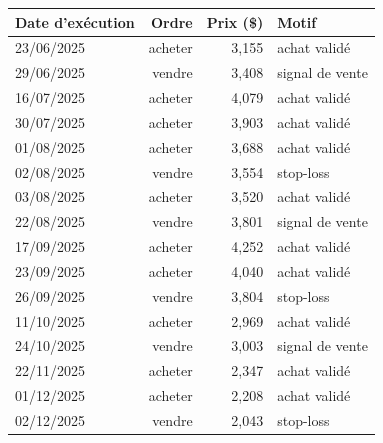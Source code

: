 \begin{tabular}{lrrl}\toprule
Date d'exécution & Ordre & Prix (\$) & Motif \\\midrule
23/06/2025 & acheter & 3,155 & achat validé \\
29/06/2025 & vendre & 3,408 & signal de vente \\
16/07/2025 & acheter & 4,079 & achat validé \\
30/07/2025 & acheter & 3,903 & achat validé \\
01/08/2025 & acheter & 3,688 & achat validé \\
02/08/2025 & vendre & 3,554 & stop-loss \\
03/08/2025 & acheter & 3,520 & achat validé \\
22/08/2025 & vendre & 3,801 & signal de vente \\
17/09/2025 & acheter & 4,252 & achat validé \\
23/09/2025 & acheter & 4,040 & achat validé \\
26/09/2025 & vendre & 3,804 & stop-loss \\
11/10/2025 & acheter & 2,969 & achat validé \\
24/10/2025 & vendre & 3,003 & signal de vente \\
22/11/2025 & acheter & 2,347 & achat validé \\
01/12/2025 & acheter & 2,208 & achat validé \\
02/12/2025 & vendre & 2,043 & stop-loss \\
\bottomrule\end{tabular}
